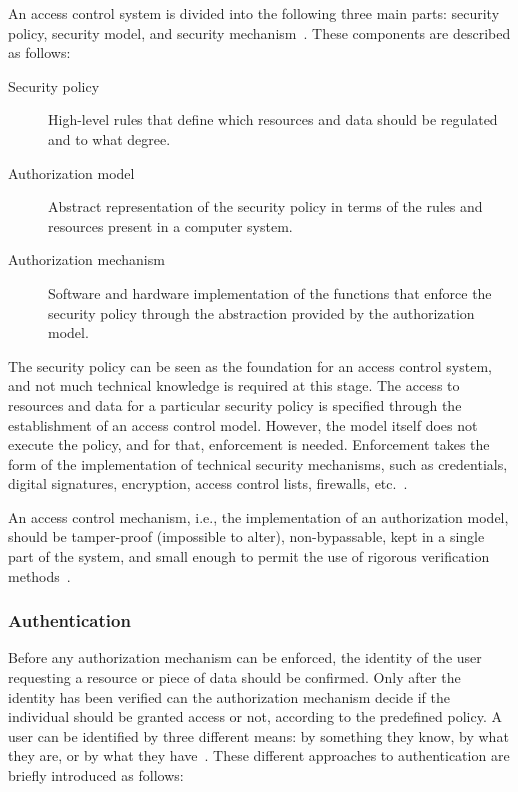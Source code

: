 \documentclass[12pt]{article}
\begin{document}
An access control system is divided into the following three main parts: security policy, security model, and security mechanism~\cite{access_02}. These components are described as follows:

\begin{description}
\item[Security policy] High-level rules that define which resources and data should be regulated and to what degree. 
\item[Authorization model] Abstract representation of the security policy in terms of the rules and resources present in a computer system.
\item[Authorization mechanism] Software and hardware implementation of the functions that enforce the security policy through the abstraction provided by the authorization model. 
\end{description}

The security policy can be seen as the foundation for an access control system, and not much technical knowledge is required at this stage. The access to resources and data for a particular security policy is specified through the establishment of an access control model. However, the model itself does not execute the policy, and for that, enforcement is needed. Enforcement takes the form of the implementation of technical security mechanisms, such as credentials, digital signatures, encryption, access control lists, firewalls, etc.~\cite{access_01}.

An access control mechanism, i.e., the implementation of an authorization model, should be tamper-proof (impossible to alter), non-bypassable, kept in a single part of the system, and small enough to permit the use of rigorous verification methods~\cite{access_02}.

\subsubsection{Authentication}

Before any authorization mechanism can be enforced, the identity of the user requesting a resource or piece of data should be confirmed. Only after the identity has been verified can the authorization mechanism decide if the individual should be granted access or not, according to the predefined policy. A user can be identified by three different means: by something they know, by what they are, or by what they have~\cite{stallings_01}. These different approaches to authentication are briefly introduced as follows:
\end{document}
